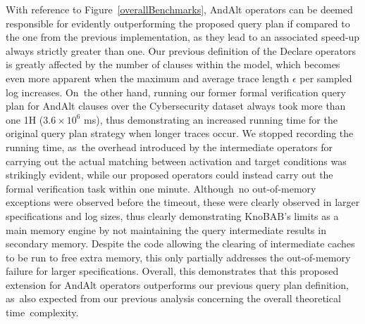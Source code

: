 \documentclass[information,article,accept,pdftex,oneauthor]{Definitions/mdpi}
\begin{document}
With reference to Figure~\ref{overallBenchmarks}, {AndAlt}%
 operators 
can be deemed responsible for evidently outperforming the proposed query plan if compared to the one from the previous implementation,
as they lead to an associated speed-up  always strictly greater than one. Our previous definition of the Declare operators is greatly affected by the number of clauses within the model, which becomes even more apparent when the maximum and average trace length $\epsilon$ per sampled log increases. On~the other hand, running our former formal verification query plan for {AndAlt} clauses  over the Cybersecurity dataset always took more than one 1H ({$3.6\times 10^6$} ms), thus demonstrating an increased running time for the original query plan strategy when longer traces occur. We stopped recording the running time, as~the overhead introduced by the intermediate operators for carrying out the actual matching between activation and target conditions was strikingly evident, while our proposed operators could instead carry out the formal verification task within one minute. Although~no out-of-memory exceptions were observed before the timeout, these were clearly observed in larger specifications and log sizes, thus clearly demonstrating KnoBAB's limits as a main memory engine by not maintaining the query intermediate results in secondary memory. Despite the code allowing the clearing of intermediate caches to be run to free extra memory, this only partially addresses the out-of-memory failure for larger specifications. %
Overall, this demonstrates that this proposed extension for {AndAlt} operators outperforms our previous query plan definition, as~also expected from our previous analysis concerning the overall theoretical time~complexity.
\end{document}
